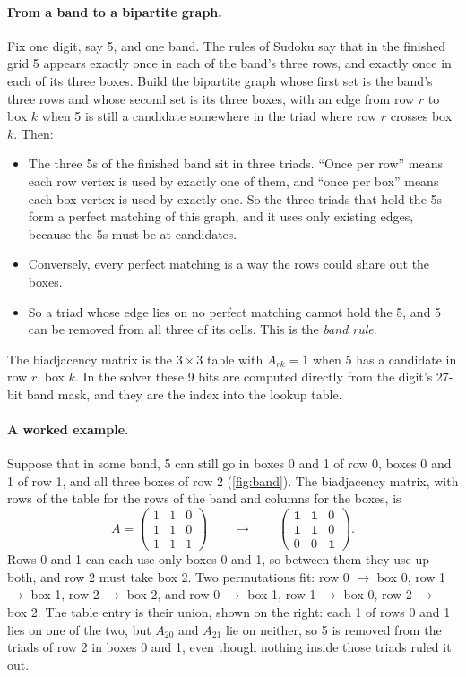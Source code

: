 \documentclass[11pt]{article}
\theoremstyle{definition}
\theoremstyle{plain}
\begin{document}
\paragraph{From a band to a bipartite graph.} Fix one digit, say 5, and one band. The rules of Sudoku say that in the
finished grid 5 appears exactly once in each of the band's three rows, and exactly once in each of its three boxes.
Build the bipartite graph whose first set is the band's three rows and whose second set is its three boxes, with an
edge from row $r$ to box $k$ when 5 is still a candidate somewhere in the triad where row $r$ crosses box $k$. Then:
\begin{itemize}
\item The three 5s of the finished band sit in three triads. ``Once per row'' means each row vertex is used by
  exactly one of them, and ``once per box'' means each box vertex is used by exactly one. So the three triads that
  hold the 5s form a perfect matching of this graph, and it uses only existing edges, because the 5s must be at
  candidates.
\item Conversely, every perfect matching is a way the rows could share out the boxes.
\item So a triad whose edge lies on no perfect matching cannot hold the 5, and 5 can be removed from all three of its
  cells. This is the \emph{band rule}.
\end{itemize}
The biadjacency matrix is the $3\times 3$ table with $A_{rk}=1$ when 5 has a candidate in row $r$, box $k$. In the solver
these 9 bits are computed directly from the digit's 27-bit band mask, and they are the index into the lookup table.

\paragraph{A worked example.} Suppose that in some band, 5 can still go in boxes 0 and 1 of row 0, boxes 0 and 1 of
row 1, and all three boxes of row 2 (\cref{fig:band}). The biadjacency matrix, with rows of the table for the rows of
the band and columns for the boxes, is
\[
A = \begin{pmatrix} 1 & 1 & 0 \\ 1 & 1 & 0 \\ 1 & 1 & 1 \end{pmatrix}
\qquad\longrightarrow\qquad
\begin{pmatrix} \mathbf{1} & \mathbf{1} & 0 \\ \mathbf{1} & \mathbf{1} & 0 \\ 0 & 0 & \mathbf{1} \end{pmatrix}.
\]
Rows 0 and 1 can each use only boxes 0 and 1, so between them they use up both, and row 2 must take box 2. Two
permutations fit: row 0 $\to$ box 0, row 1 $\to$ box 1, row 2 $\to$ box 2, and row 0 $\to$ box 1, row 1 $\to$ box 0,
row 2 $\to$ box 2. The table entry is their union, shown on the right: each 1 of rows 0 and 1 lies on one of the two,
but $A_{20}$ and $A_{21}$ lie on neither, so 5 is removed from the triads of row 2 in boxes 0 and 1, even though
nothing inside those triads ruled it out.
\end{document}
